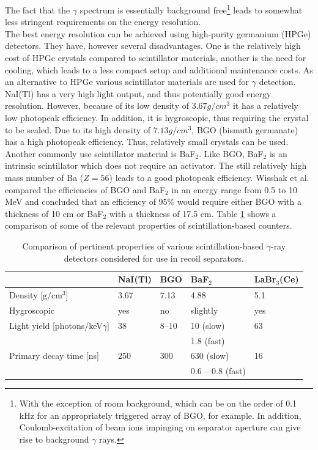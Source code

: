 The fact that the $\gamma$ spectrum is essentially background free\footnote{With the exception of room background, which can be on the order of 0.1 kHz for an appropriately triggered array of BGO, for example. In addition, Coulomb-excitation of beam ions impinging on separator aperture can give rise to background $\gamma$ rays.} leads to somewhat less stringent requirements on the energy resolution. \\
The best energy resolution can be achieved using high-purity germanium (HPGe) detectors. They have, however several disadvantages. One is the relatively high cost of HPGe crystals compared to scintillator materials, another is the need for cooling, which leads to a less compact setup and additional maintenance costs. As an alternative to HPGe various scintillator materials are used for $\gamma$ detection. NaI(Tl) has a very high light output, and thus potentially good energy resolution. However, because of its low density of $3.67\unit{g/cm^3}$ it has a relatively low photopeak efficiency. In addition, it is hygroscopic, thus requiring the crystal to be sealed. Due to its high density of $7.13 \unit{g/cm^3}$, BGO (bismuth germanate) has a high photopeak efficiency. Thus, relatively small crystals can be used. Another commonly use scintillator material is BaF$_2$. Like BGO, BaF$_2$ is an intrinsic scintillator which does not require an activator. The still relatively high mass number of Ba ($Z = 56$) leads to a good photopeak efficiency. Wisshak et al. \cite{wiss84} compared the efficiencies of BGO and BaF$_2$ in an energy range from 0.5 to 10 MeV and concluded that an efficiency of 95\% would require either BGO with a thickness of 10 cm or BaF$_2$ with a thickness of 17.5 cm. Table \ref{tab:gamma_detectors} shows a comparison of some of the relevant properties of scintillation-based counters.



\begin{table}
\label{tab:gamma_detectors}
\centering
\begin{tabular}{l|llll}
\hline
 & NaI(Tl) & BGO & BaF$_2$ & LaBr$_3$(Ce) \\
\hline
Density [$\mathrm{g/cm^3}$] & 3.67  & 7.13 & 4.88 & 5.1 \\
Hygroscopic & yes & no & slightly & yes\\
Light yield [photons/keV$\gamma$] & 38 & 8--10 & 10 (slow) & 63 \\
                                  &    &       & 1.8 (fast) &\\
Primary decay time [ns] & 250 & 300 & 630 (slow)  & 16\\
                        &     &     & 0.6 -- 0.8 (fast) &\\
\hline
\end{tabular}

\caption{Comparison of pertinent properties of various scintillation-based $\gamma$-ray detectors considered for use in recoil separators.}
\end{table}


